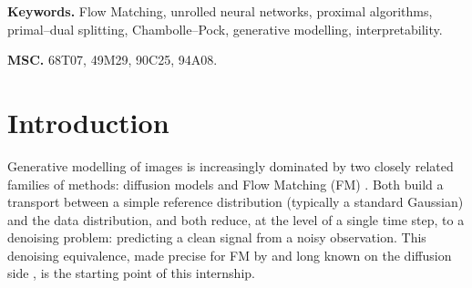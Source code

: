 \documentclass[a4paper,11pt]{article}
\theoremstyle{plain}{\theorembodyfont{\rmfamily}%
\newtheorem{proposition}[theorem]{Proposition}}
\theoremstyle{plain}{\theorembodyfont{\rmfamily}%
\newtheorem{notation}[theorem]{Notation}}
\theoremstyle{plain}{\theorembodyfont{\rmfamily}%
\newtheorem{assumption}[theorem]{Assumption}}
\theoremstyle{plain}{\theorembodyfont{\rmfamily}%
\newtheorem{problem}[theorem]{Problem}}
\theoremstyle{plain}{\theorembodyfont{\rmfamily}%
\newtheorem{example}[theorem]{Example}}
\theoremstyle{plain}{\theorembodyfont{\rmfamily}%
\newtheorem{remark}[theorem]{Remark}}
\theoremstyle{plain}{\theorembodyfont{\rmfamily}%
\newtheorem{definition}[theorem]{Definition}}
\theoremstyle{plain}{\theorembodyfont{\rmfamily}%
\newtheorem{question}[theorem]{Question}}
\numberwithin{equation}{section}
\begin{document}
\thispagestyle{empty}

\vskip 8mm

\begin{abstract}
Flow Matching (FM) achieves state-of-the-art performance in image generation, and
its links with diffusion and denoising are now well described in the literature.
Exploiting this equivalence, we study unfolded (or unrolled) neural networks (UNN), light and robust architectures obtained by unrolling proximal algorithms
designed for Gaussian denoising, as velocity estimators for FM. We show that an
unfolded strongly-convex Chambolle--Pock network, once conditioned on the noise
level, generates samples on 2-moons and MNIST, and show encouraging results for AFHQ-32. Furthermore, such architectures bring an interpretability that is out of
reach of the usual backbones: because they alternate between a primal variable that
remains a full-resolution image and a dual variable, half of the internal states of the
network can be displayed, and the denoising performed at each layer of each
integration step can be monitored directly. However, those can also bring limitations of
unfolded architectures for generation, in particular the expressivity cost of
keeping the primal iterate in image space, and training UNNs can be very costly. All of our code is in [github].
\end{abstract}

{\bfseries Keywords.}
Flow Matching, unrolled neural networks, proximal algorithms, primal--dual
splitting, Chambolle--Pock, generative modelling, interpretability.

{\bfseries MSC.}
68T07, 49M29, 90C25, 94A08.

\tableofcontents

\section{Introduction}
\label{sec:intro}

Generative modelling of images is increasingly dominated by two closely related
families of methods: diffusion models \cite{ho2020denoising, song2021score} and
Flow Matching (FM) \cite{lipman2023flowmatching, liu2023flow, albergo2023building}. Both build a
transport between a simple reference distribution (typically a standard Gaussian)
and the data distribution, and both reduce, at the level of a single time step,
to a denoising problem: predicting a clean signal from a noisy observation. This
denoising equivalence, made precise for FM by \cite{gagneux2025avisualdive,
gagneux2025generation} and long known on the diffusion side
\cite{dieleman2022diffusion, gao2025diffusion}, is the starting point of this
internship.
\end{document}
